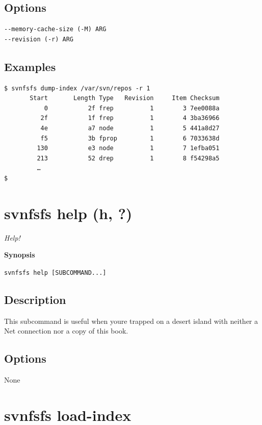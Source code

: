 \subsection{Options}

\begin{verbatim}
--memory-cache-size (-M) ARG
--revision (-r) ARG
\end{verbatim}

\subsection{Examples}

\begin{verbatim}
$ svnfsfs dump-index /var/svn/repos -r 1
       Start       Length Type   Revision     Item Checksum
           0           2f frep          1        3 7ee0088a
          2f           1f frep          1        4 3ba36966
          4e           a7 node          1        5 441a8d27
          f5           3b fprop         1        6 7033638d
         130           e3 node          1        7 1efba051
         213           52 drep          1        8 f54298a5
         …
$
\end{verbatim}

\section{svnfsfs help (h, ?)}\label{svn.ref.svnfsfs.c.help}

\emph{Help!}

\textbf{Synopsis}

\texttt{svnfsfs\ help\ {[}SUBCOMMAND...{]}}

\subsection{Description}

This subcommand is useful when you\textquotesingle re trapped on a
desert island with neither a Net connection nor a copy of this book.

\subsection{Options}

None

\section{svnfsfs load-index}\label{svn.ref.svnfsfs.c.load-index}

